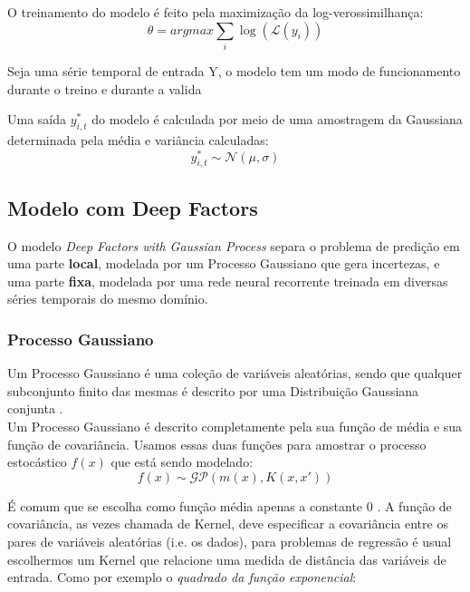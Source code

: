 O treinamento do modelo é feito pela maximização da log-verossimilhança: \\

\[
\theta = argmax \sum_i{\log(\mathcal{L}(y_i))}
\]


Seja uma série temporal de entrada Y, o modelo tem um modo de funcionamento durante o treino e durante a valida 


Uma saída $y^*_{i,t}$ do modelo é calculada por meio de uma amostragem da Gaussiana determinada pela média e variância calculadas: \\

\[
 y^*_{i,t} \sim \mathcal{N}(\mu,\sigma) 
\]

\subsection{Modelo com Deep Factors}

O modelo \textit{Deep Factors with Gaussian Process} \cite{deepfactors} separa o problema de predição em uma parte \textbf{local}, modelada por um Processo Gaussiano que gera incertezas, e uma parte \textbf{fixa}, modelada por uma rede neural recorrente treinada em diversas séries temporais do mesmo domínio.

\subsubsection{Processo Gaussiano}

Um Processo Gaussiano é uma coleção de variáveis aleatórias,
sendo que qualquer subconjunto finito das mesmas é descrito por uma Distribuição Gaussiana conjunta \cite{gpml}. \\

Um Processo Gaussiano é descrito completamente pela sua função de média e sua função de covariância. Usamos essas duas funções para amostrar o processo estocástico $f(x)$ que está sendo modelado: \\

\[
f(x) \sim \mathcal{GP}( m(x), K(x,x'))
\]

É comum que se escolha como função média apenas a constante 0 \cite{gpml}.  A função de covariância, as vezes chamada de Kernel, deve especificar a covariância entre os pares de variáveis aleatórias (i.e. os dados), para problemas de regressão é usual escolhermos um Kernel que relacione uma medida de distância das variáveis de entrada. Como por exemplo o \textit{quadrado da função exponencial}: \\

